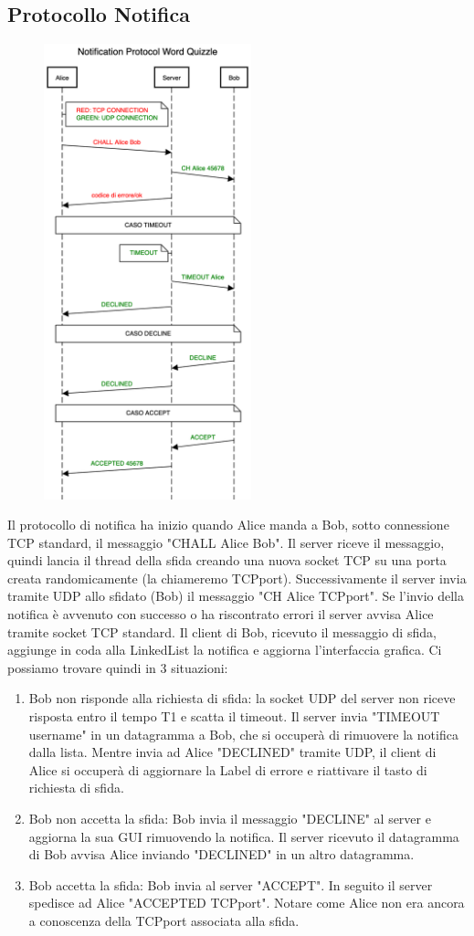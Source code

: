 \documentclass{article}
\begin{document}
\subsection{Protocollo Notifica}
\begin{figure}
\centering
\includegraphics[width=6cm]{chprotocolscheme.png}
\end{figure}
Il protocollo di notifica ha inizio quando Alice manda a Bob, sotto connessione TCP standard, il messaggio "CHALL Alice Bob". Il server riceve il messaggio, quindi lancia il thread della sfida creando una nuova socket TCP su una porta creata randomicamente (la chiameremo TCPport). Successivamente il server invia tramite UDP allo sfidato (Bob) il messaggio "CH Alice TCPport". Se l'invio della notifica è avvenuto con successo o ha riscontrato errori il server avvisa Alice tramite socket TCP standard. Il client di Bob, ricevuto il messaggio di sfida, aggiunge in coda alla LinkedList la notifica e aggiorna l'interfaccia grafica.
Ci possiamo trovare quindi in 3 situazioni:
\begin{enumerate}
  \item Bob non risponde alla richiesta di sfida: la socket UDP del server non riceve risposta entro il tempo T1 e scatta il timeout. Il server invia "TIMEOUT username" in un datagramma a Bob, che si occuperà di rimuovere la notifica dalla lista. Mentre invia ad Alice "DECLINED" tramite UDP, il client di Alice si occuperà di aggiornare la Label di errore e riattivare il tasto di richiesta di sfida.
  \item Bob non accetta la sfida: Bob invia il messaggio "DECLINE" al server e aggiorna la sua GUI rimuovendo la notifica. Il server ricevuto il datagramma di Bob avvisa Alice inviando "DECLINED" in un altro datagramma.
  \item Bob accetta la sfida: Bob invia al server "ACCEPT". In seguito il server spedisce ad Alice "ACCEPTED TCPport". Notare come Alice non era ancora a conoscenza della TCPport associata alla sfida.
\end{enumerate}
\end{document}
